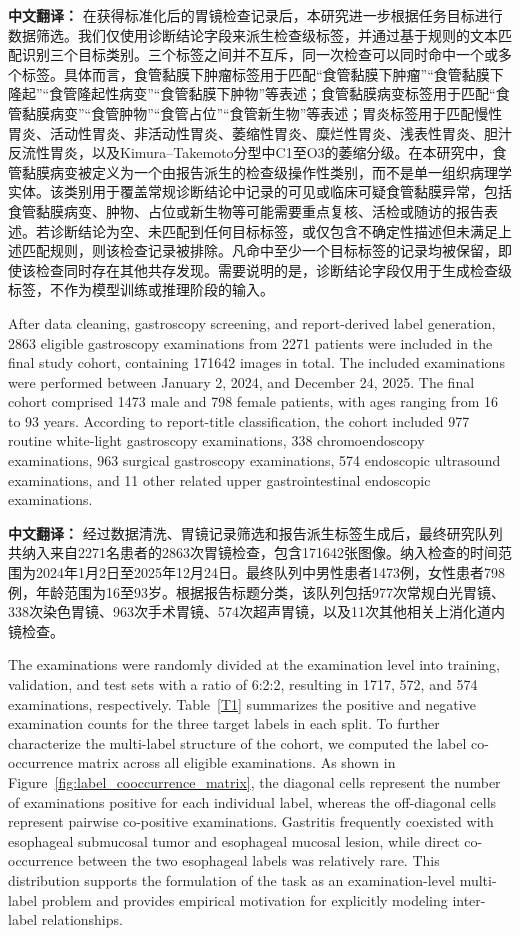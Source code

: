 \documentclass[Afour,sagev,times]{sagej}
\begin{document}
\textbf{中文翻译：} 在获得标准化后的胃镜检查记录后，本研究进一步根据任务目标进行数据筛选。我们仅使用诊断结论字段来派生检查级标签，并通过基于规则的文本匹配识别三个目标类别。三个标签之间并不互斥，同一次检查可以同时命中一个或多个标签。具体而言，食管黏膜下肿瘤标签用于匹配“食管黏膜下肿瘤”“食管黏膜下隆起”“食管隆起性病变”“食管黏膜下肿物”等表述；食管黏膜病变标签用于匹配“食管黏膜病变”“食管肿物”“食管占位”“食管新生物”等表述；胃炎标签用于匹配慢性胃炎、活动性胃炎、非活动性胃炎、萎缩性胃炎、糜烂性胃炎、浅表性胃炎、胆汁反流性胃炎，以及Kimura--Takemoto分型中C1至O3的萎缩分级。在本研究中，食管黏膜病变被定义为一个由报告派生的检查级操作性类别，而不是单一组织病理学实体。该类别用于覆盖常规诊断结论中记录的可见或临床可疑食管黏膜异常，包括食管黏膜病变、肿物、占位或新生物等可能需要重点复核、活检或随访的报告表述。若诊断结论为空、未匹配到任何目标标签，或仅包含不确定性描述但未满足上述匹配规则，则该检查记录被排除。凡命中至少一个目标标签的记录均被保留，即使该检查同时存在其他共存发现。需要说明的是，诊断结论字段仅用于生成检查级标签，不作为模型训练或推理阶段的输入。

After data cleaning, gastroscopy screening, and report-derived label generation, 2863 eligible gastroscopy examinations from 2271 patients were included in the final study cohort, containing 171642 images in total. The included examinations were performed between January 2, 2024, and December 24, 2025. The final cohort comprised 1473 male and 798 female patients, with ages ranging from 16 to 93 years. According to report-title classification, the cohort included 977 routine white-light gastroscopy examinations, 338 chromoendoscopy examinations, 963 surgical gastroscopy examinations, 574 endoscopic ultrasound examinations, and 11 other related upper gastrointestinal endoscopic examinations.

\textbf{中文翻译：} 经过数据清洗、胃镜记录筛选和报告派生标签生成后，最终研究队列共纳入来自2271名患者的2863次胃镜检查，包含171642张图像。纳入检查的时间范围为2024年1月2日至2025年12月24日。最终队列中男性患者1473例，女性患者798例，年龄范围为16至93岁。根据报告标题分类，该队列包括977次常规白光胃镜、338次染色胃镜、963次手术胃镜、574次超声胃镜，以及11次其他相关上消化道内镜检查。

The examinations were randomly divided at the examination level into training, validation, and test sets with a ratio of 6:2:2, resulting in 1717, 572, and 574 examinations, respectively. Table~\ref{T1} summarizes the positive and negative examination counts for the three target labels in each split. To further characterize the multi-label structure of the cohort, we computed the label co-occurrence matrix across all eligible examinations. As shown in Figure~\ref{fig:label_cooccurrence_matrix}, the diagonal cells represent the number of examinations positive for each individual label, whereas the off-diagonal cells represent pairwise co-positive examinations. Gastritis frequently coexisted with esophageal submucosal tumor and esophageal mucosal lesion, while direct co-occurrence between the two esophageal labels was relatively rare. This distribution supports the formulation of the task as an examination-level multi-label problem and provides empirical motivation for explicitly modeling inter-label relationships.
\end{document}
